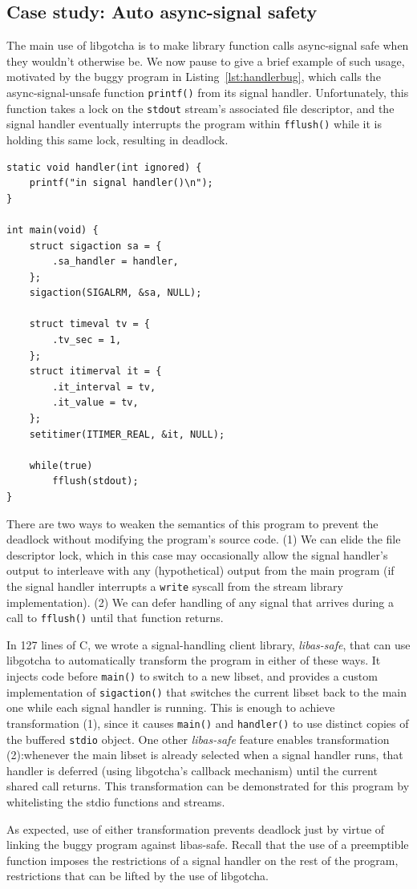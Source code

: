 \subsection{Case study: Auto async-signal safety}
\label{sec:statefulness}

The main use of libgotcha is to make library function calls async-signal safe when
they wouldn't otherwise be.  We now pause to give a brief example of such usage,
motivated by the buggy program in Listing~\ref{lst:handlerbug}, which calls the
async-signal-unsafe function \texttt{printf()} from its signal handler.
Unfortunately, this function takes a lock on the \texttt{stdout} stream's associated
file descriptor, and the signal handler eventually interrupts the program within
\texttt{fflush()} while it is holding this same lock, resulting in deadlock.

\begin{lstlisting}[label=lst:handlerbug,caption=C program with a buggy signal handler]
static void handler(int ignored) {
	printf("in signal handler()\n");
}

int main(void) {
	struct sigaction sa = {
		.sa_handler = handler,
	};
	sigaction(SIGALRM, &sa, NULL);

	struct timeval tv = {
		.tv_sec = 1,
	};
	struct itimerval it = {
		.it_interval = tv,
		.it_value = tv,
	};
	setitimer(ITIMER_REAL, &it, NULL);

	while(true)
		fflush(stdout);
}
\end{lstlisting}

There are two ways to weaken the semantics of this program to prevent the deadlock
without modifying the program's source code.  (1) We can elide the file descriptor
lock, which in this case may occasionally allow the signal handler's output to
interleave with any (hypothetical) output from the main program (if the signal
handler interrupts a \texttt{write} syscall from the stream library implementation).
(2) We can defer handling of any signal that arrives during a call to
\texttt{fflush()} until that function returns.

In 127 lines of C, we wrote a signal-handling client library, \textit{libas-safe},
that can use libgotcha to automatically transform the program in either of these
ways.  It injects code before \texttt{main()} to switch to a new libset, and
provides a custom implementation of \texttt{sigaction()} that switches the current
libset back to the main one while each signal handler is running.  This is enough to
achieve transformation (1), since it causes \texttt{main()} and \texttt{handler()} to
use distinct copies of the buffered \texttt{stdio} object.  One other
\textit{libas-safe} feature enables transformation (2):\@ whenever the main libset is
already selected when a signal handler runs, that handler is deferred (using
libgotcha's callback mechanism) until the current shared call returns.  This
transformation can be demonstrated for this program by whitelisting the stdio
functions and streams.

As expected, use of either transformation prevents deadlock just by virtue of linking
the buggy program against libas-safe.  Recall that the use of a preemptible function
imposes the restrictions of a signal handler on the rest of the program, restrictions
that can be lifted by the use of libgotcha.
